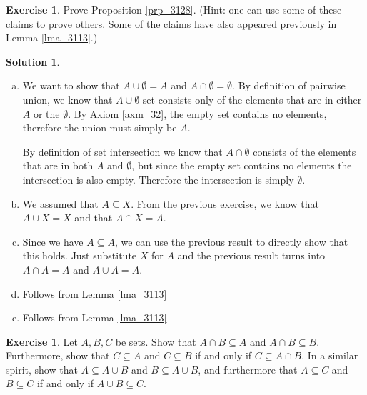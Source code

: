 \documentclass[a4paper, twocolumn]{report}
\newcounter{exercise} \numberwithin{exercise}{section}
\theoremstyle{definition}
\newtheorem{exc}[exercise]{Exercise}
\theoremstyle{solution}
\newtheorem*{sltn}{Solution}
\newcommand{\union}{\cup}
\newcommand{\intrsct}{\cap}
\begin{document}
\begin{exc}
  Prove Proposition \ref{prp_3128}. (Hint: one can use some of these claims to
    prove others. Some of the claims have also appeared previously in Lemma
  \ref{lma_3113}.)
\end{exc}
\begin{sltn}
  \begin{enumerate}[(a)]
    \item We want to show that $A \union \emptyset = A$ and $A \intrsct \emptyset = \emptyset$.
      By definition of pairwise union, we know that $A \union \emptyset$ set
      consists only of the elements that are in either $A$ or the $\emptyset$. By
      Axiom \ref{axm_32}, the empty set contains no elements, therefore the union
      must simply be $A$.

      By definition of set intersection we know that $A \intrsct \emptyset$
      consists of the elements that are in both $A$ and $\emptyset$, but since
      the empty set contains no elements the intersection is also empty.
      Therefore the intersection is simply $\emptyset$. 

    \item  We assumed that $A \subseteq X$. From the previous exercise, we know
      that $A \union X = X$ and that $A \intrsct X = A$.

    \item Since we have $A \subseteq A$, we can use the previous result to
      directly show that this holds.  Just substitute $X$ for $A$ and the
      previous result turns into $A \intrsct A = A$ and $A \union A = A$.

    \item Follows from Lemma \ref{lma_3113}

    \item Follows from Lemma \ref{lma_3113}


  \end{enumerate} 
\end{sltn}

\begin{exc}
  Let $A, B, C$ be sets. Show that $A \intrsct B \subseteq A$ and $A \intrsct B
  \subseteq B$.  Furthermore, show that $C \subseteq A$ and $C \subseteq B$ if
  and only if $C \subseteq A \intrsct B$.  In a similar spirit, show that $A
  \subseteq A\union B$ and $B \subseteq A \union B$, and furthermore that $A
  \subseteq C$ and $B \subseteq C$ if and only if $A \union B \subseteq C$.
\end{exc}
\end{document}
